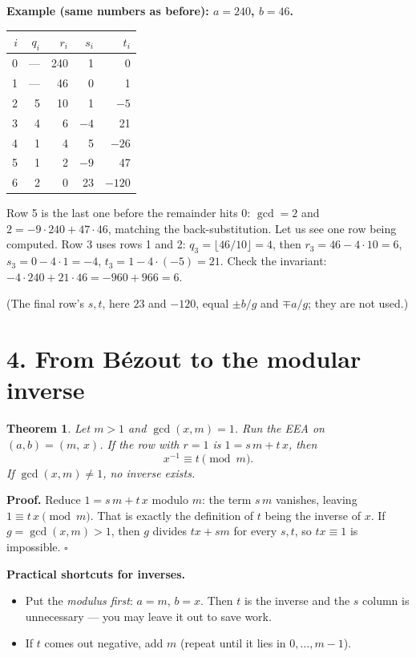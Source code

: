 \documentclass[11pt]{article}
\newtheorem{theorem}{Theorem}
\newcommand{\hl}{\rowcolor{green!15}}
\begin{document}
\textbf{Example (same numbers as before): $a=240$, $b=46$.}
\begin{center}
\renewcommand{\arraystretch}{1.2}
\begin{tabular}{@{}rrrrr@{}}
\toprule
$i$ & $q_i$ & $r_i$ & $s_i$ & $t_i$ \\
\midrule
0 & --- & 240 & 1 & 0 \\
1 & --- & 46 & 0 & 1 \\
2 & 5 & 10 & 1 & $-5$ \\
3 & 4 & 6 & $-4$ & 21 \\
4 & 1 & 4 & 5 & $-26$ \\
\hl 5 & 1 & 2 & $-9$ & 47 \\
6 & 2 & 0 & 23 & $-120$ \\
\bottomrule
\end{tabular}
\end{center}
Row 5 is the last one before the remainder hits $0$: $\gcd=2$ and $2=-9\cdot240+47\cdot46$, matching the back-substitution. Let us see one row being computed. Row 3 uses rows 1 and 2: $q_3=\lfloor46/10\rfloor=4$, then $r_3=46-4\cdot10=6$, $s_3=0-4\cdot1=-4$, $t_3=1-4\cdot(-5)=21$. Check the invariant: $-4\cdot240+21\cdot46=-960+966=6$. \checkmark

(The final row's $s,t$, here $23$ and $-120$, equal $\pm b/g$ and $\mp a/g$; they are not used.)

\hrulefill

\section*{4. From B\'ezout to the modular inverse}

\begin{theorem}
Let $m>1$ and $\gcd(x,m)=1$. Run the EEA on $(a,b)=(m,\,x)$. If the row with $r=1$ is $1=s\,m+t\,x$, then
\[
x^{-1}\equiv t \pmod m.
\]
If $\gcd(x,m)\ne1$, no inverse exists.
\end{theorem}

\textbf{Proof.} Reduce $1=s\,m+t\,x$ modulo $m$: the term $s\,m$ vanishes, leaving $1\equiv t\,x\pmod m$. That is exactly the definition of $t$ being the inverse of $x$. If $g=\gcd(x,m)>1$, then $g$ divides $tx+sm$ for every $s,t$, so $tx\equiv1$ is impossible. \hfill$\square$

\textbf{Practical shortcuts for inverses.}
\begin{itemize}[nosep]
\item Put the \emph{modulus first}: $a=m$, $b=x$. Then $t$ is the inverse and the $s$ column is unnecessary --- you may leave it out to save work.
\item If $t$ comes out negative, add $m$ (repeat until it lies in $0,\dots,m-1$).
\end{itemize}
\end{document}
